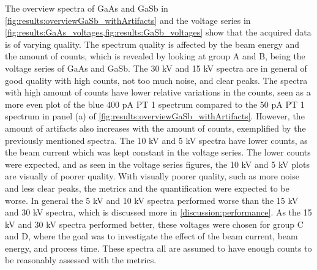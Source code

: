 The overview spectra of GaAs and GaSb in \cref{fig:results:overviewGaSb_withArtifacts} and the voltage series in \cref{fig:results:GaAs_voltages,fig:results:GaSb_voltages} show that the acquired data is of varying quality.
The spectrum quality is affected by the beam energy and the amount of counts, which is revealed by looking at group A and B, being the voltage series of GaAs and GaSb.
The 30 kV and 15 kV spectra are in general of good quality with high counts, not too much noise, and clear peaks.
The spectra with high amount of counts have lower relative variations in the counts, seen as a more even plot of the blue 400 pA PT 1 spectrum compared to the 50 pA PT 1 spectrum in panel (a) of \cref{fig:results:overviewGaSb_withArtifacts}.
However, the amount of artifacts also increases with the amount of counts, exemplified by the previously mentioned spectra.
The 10 kV and 5 kV spectra have lower counts, as the beam current which was kept constant in the voltage series.
The lower counts were expected, and as seen in the voltage series figures, the 10 kV and 5 kV plots are visually of poorer quality.
With visually poorer quality, such as more noise and less clear peaks, the metrics and the quantification were expected to be worse.
In general the 5 kV and 10 kV spectra performed worse than the 15 kV and 30 kV spectra, which is discussed more in \cref{discussion:performance}.
As the 15 kV and 30 kV spectra performed better, these voltages were chosen for group C and D, where the goal was to investigate the effect of the beam current, beam energy, and process time.
These spectra all are assumed to have enough counts to be reasonably assessed with the metrics.


